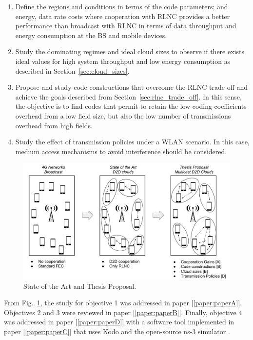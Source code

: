 \begin{enumerate}

\item Define the regions and conditions in terms of the code parameters; and energy, data rate costs where cooperation with \ac{RLNC} provides a better performance than broadcast with \ac{RLNC} in terms of data throughput and energy consumption at the \ac{BS} and mobile devices.

\item Study the dominating regimes and ideal cloud sizes to observe if there exists ideal values for high system throughput and low energy consumption as described in Section~\ref{sec:cloud_sizes}.

\item Propose and study code constructions that overcome the \ac{RLNC} trade-off and achieve the goals described from Section~\ref{sec:rlnc_trade_off}. In this sense, the objective is to find codes that permit to retain the low coding coefficients overhead from a low field size, but also the low number of transmissions overhead from high fields.

\item Study the effect of transmission policies under a \ac{WLAN} scenario. In this case, medium access mechanisms to avoid interference should be considered.
\end{enumerate}

\begin{figure}[h]
  \centering
  \includegraphics[width=\textwidth]{introduction/figures/thesis-diagrams.pdf}
  \caption{State of the Art and Thesis Proposal.}
\label{fig:proposal}
\end{figure}

From Fig.~\ref{fig:proposal}, the study for objective 1 was addressed in paper {[\ref{paper:paperA}]}. Objectives 2 and 3 were reviewed in paper {[\ref{paper:paperB}]}. Finally, objective 4 was addressed in paper {[\ref{paper:paperD}]} with a software tool implemented in paper {[\ref{paper:paperC}]} that uses Kodo and the open-source ns-3 simulator \cite{ns3link}.

